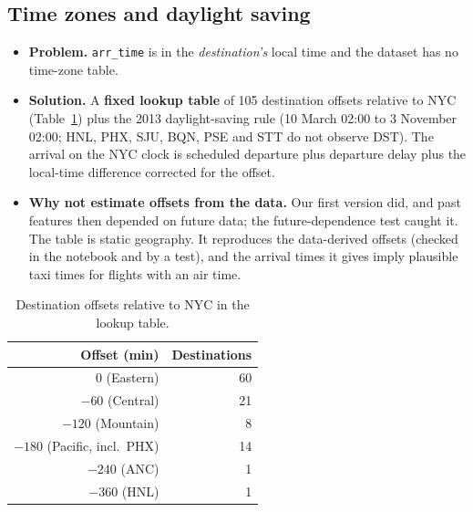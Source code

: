 \documentclass[conference]{IEEEtran}
\newcommand{\tabsize}{\footnotesize}
\begin{document}
\subsection{Time zones and daylight saving}
\begin{itemize}
\item \textbf{Problem.} \texttt{arr\_time} is in the \emph{destination's} local time and the dataset has no time-zone table.
\item \textbf{Solution.} A \textbf{fixed lookup table} of 105 destination offsets relative to NYC (Table~\ref{tab:tz}) plus the 2013 daylight-saving rule (10 March 02:00 to 3 November 02:00; HNL, PHX, SJU, BQN, PSE and STT do not observe DST). The arrival on the NYC clock is scheduled departure plus departure delay plus the local-time difference corrected for the offset.
\item \textbf{Why not estimate offsets from the data.} Our first version did, and past features then depended on future data; the future-dependence test caught it. The table is static geography. It reproduces the data-derived offsets (checked in the notebook and by a test), and the arrival times it gives imply plausible taxi times for flights with an air time.
\end{itemize}

\begin{table}[t]
\caption{Destination offsets relative to NYC in the lookup table.}
\label{tab:tz}
\centering\tabsize
\begin{tabular}{rr}
\toprule
Offset (min) & Destinations\\
\midrule
0 (Eastern) & 60\\
$-60$ (Central) & 21\\
$-120$ (Mountain) & 8\\
$-180$ (Pacific, incl.\ PHX) & 14\\
$-240$ (ANC) & 1\\
$-360$ (HNL) & 1\\
\bottomrule
\end{tabular}
\end{table}
\end{document}
